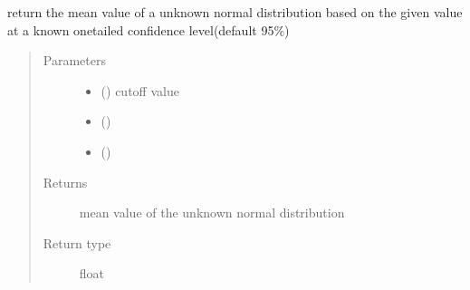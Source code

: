 \documentclass[letterpaper,10pt,english]{sphinxmanual}
\begin{document}
\begin{fulllineitems}
\label{\detokenize{helper_func:helper_func.find_mean}}
\sphinxAtStartPar
return the mean value of a unknown normal distribution
based on the given value at a known one\sphinxhyphen{}tailed confidence level(default 95\%)
\begin{quote}\begin{description}
\item[{Parameters}] \leavevmode\begin{itemize}
\item {} 
\sphinxAtStartPar
{} () \textendash{} cut\sphinxhyphen{}off value

\item {} 
\sphinxAtStartPar
{} () \textendash{} 

\item {} 
\sphinxAtStartPar
{} () \textendash{} 

\end{itemize}

\item[{Returns}] \leavevmode
\sphinxAtStartPar
mean value of the unknown normal distribution

\item[{Return type}] \leavevmode
\sphinxAtStartPar
float

\end{description}\end{quote}

\end{fulllineitems}

\end{document}
